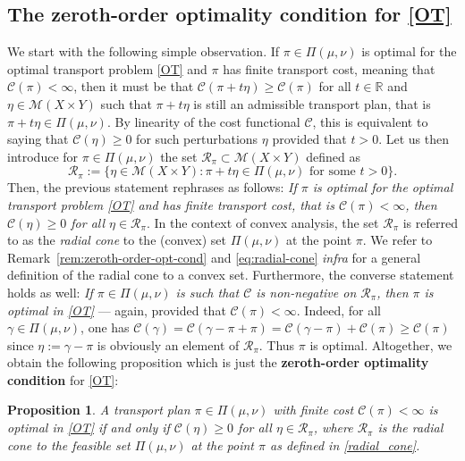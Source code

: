 \documentclass[leqno, 11pt, a4paper]{amsart}
\newtheorem{prop}{Proposition}
\theoremstyle{definition}
\newcommand{\cR}{\mathcal{R}}
\newcommand{\R}{\mathbb{R}}
\newcommand{\C}{\mathscr{C}}
\newcommand{\cM}{\mathcal{M}}
\begin{document}
\subsection{The zeroth-order optimality condition for \eqref{OT}}
We start with the following simple observation. If $\pi \in \Pi(\mu, \nu)$ is optimal for the optimal transport problem \eqref{OT} and $\pi$ has finite transport cost, meaning that $\C(\pi) < \infty$, then it must be that $\C(\pi + t \eta) \geq \C(\pi)$ for all $t \in \R$ and $\eta \in \cM(X \times Y)$ such that $\pi + t \eta$ is still an admissible transport plan, that is $\pi + t \eta \in \Pi(\mu, \nu)$. By linearity of the cost functional $\C$, this is equivalent to saying that $\C(\eta) \geq 0$ for such perturbations $\eta$ provided that $t > 0$. Let us then introduce for $\pi \in \Pi(\mu, \nu)$ the set $\cR_\pi \subset \cM(X \times Y)$ defined as
\begin{equation}\label{radial_cone}
	\boxed{\cR_\pi := \bigg\{\eta \in \cM(X \times Y) : \pi + t \eta \in \Pi(\mu, \nu) \text{ for some } t > 0 \bigg\}.}
\end{equation} 
Then, the previous statement rephrases as follows: \textit{If $\pi$ is optimal for the optimal transport problem \eqref{OT} and has finite transport cost, that is $\C(\pi) < \infty$, then $\C(\eta) \geq 0$ for all $\eta \in \cR_\pi$}. In the context of convex analysis, the set $\cR_\pi$ is referred to as the \textit{radial cone} to the (convex) set $\Pi(\mu, \nu)$ at the point $\pi$. We refer to Remark~\ref{rem:zeroth-order-opt-cond} and \eqref{eq:radial-cone} \textit{infra} for a general definition of the radial cone to a convex set. Furthermore, the converse statement holds as well: \textit{If $\pi \in \Pi(\mu, \nu)$ is such that $\C$ is non-negative on $\cR_\pi$, then $\pi$ is optimal in \eqref{OT}} — again, provided that $\C(\pi)< \infty$. Indeed, for all $\gamma \in \Pi(\mu, \nu)$, one has $\C(\gamma) = \C(\gamma - \pi + \pi) = \C(\gamma - \pi) + \C(\pi) \geq \C(\pi)$ since $\eta := \gamma-\pi$ is  obviously an element of $\cR_\pi$. Thus $\pi$ is optimal. Altogether, we obtain the following proposition which is just the \textbf{zeroth-order optimality condition} for \eqref{OT}:
\begin{prop}\label{prop:zero-order-cond}
	A transport plan $\pi \in \Pi(\mu, \nu)$ with finite cost $\C(\pi) < \infty$ is optimal in \eqref{OT} if and only if $\C(\eta) \geq 0$ for all $\eta \in \cR_\pi$, where $\cR_\pi$ is the radial cone to the feasible set $\Pi(\mu, \nu)$ at the point $\pi$ as defined in \eqref{radial_cone}.
\end{prop}
\end{document}
